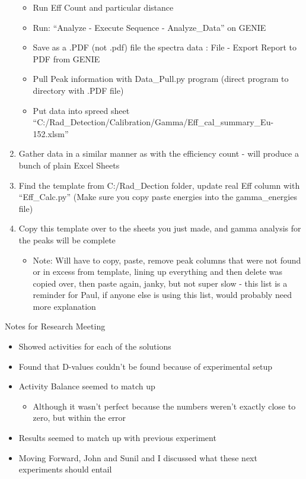 \documentclass[idxtotoc,hyperref,openany,oneside]{labbook} %
\newcommand{\cmark}{\ding{51}}%
\newcommand{\done}{\rlap{$\square$}{\raisebox{2pt}{\large\hspace{1pt}\cmark}}%
  \hspace{-2.5pt}}
\begin{document}
\begin{todolist}
\begin{enumerate}
    \begin{itemize}
    \item{Run Eff Count and particular distance}
    \item{Run: ``Analyze - Execute Sequence - Analyze\_Data''
      on GENIE}
    \item{Save as a .PDF (not .pdf) file the spectra data
      : File - Export Report to PDF from GENIE}
    \item{Pull Peak information with Data\_Pull.py program (direct
    program to directory with .PDF file)}
    \item{Put data into spreed sheet
    ``C:/Rad\_Detection/Calibration/Gamma/Eff\_cal\_summary\_Eu-152.xlsm''}
    \end{itemize}
  \item{Gather data in a similar manner as with the efficiency count
  - will produce a bunch of plain Excel Sheets}
  \item{Find the template  from C:/Rad\_Dection folder, update
    real Eff column with ``Eff\_Calc.py'' (Make sure you
    copy paste energies into the gamma\_energies file)}
  \item{Copy this template over to the sheets you just made,
    and gamma analysis for the peaks will be complete}
    \begin{itemize}
    \item{Note: Will have to copy, paste, remove peak columns that
      were not found or in excess from template, lining up everything
      and then delete was copied over, then paste again, janky,
      but not super slow - this list is a reminder for Paul,
      if anyone else is using this list, would probably need
      more explanation }
    \end{itemize}
  \end{enumerate}
\item[\done]{Notes for Research Meeting}
  \begin{itemize}
  \item{Showed activities for each of the solutions}
  \item{Found that D-values couldn't be found because
    of experimental setup}
  \item{Activity Balance seemed to match up}
    \begin{itemize}
    \item{Although it wasn't perfect because the numbers
    weren't exactly close to zero, but within the error}
    \end{itemize}
  \item{Results seemed to match up with previous experiment}
  \item{Moving Forward, John and Sunil and I discussed
    what these next experiments should entail}
  \end{itemize}
\end{todolist}
\end{document}
